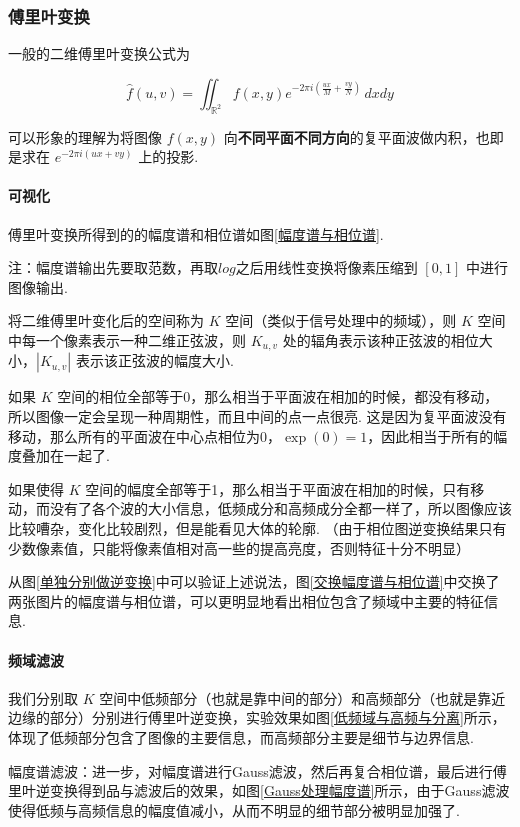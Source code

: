 \documentclass[12pt, a4paper, oneside]{ctexart}
\def\R{\mathbb{R}}          %
\begin{document}
\subsubsection{傅里叶变换}

一般的二维傅里叶变换公式为

\[\hat{f}(u,v) = \iint_{\R^2}f(x, y)e^{-2\pi i(\frac{ux}{M}+\frac{vy}{N})}\,dxdy\]

可以形象的理解为将图像 \(f(x,y)\)
向\textbf{不同平面不同方向}的复平面波做内积，也即是求在
\(e^{-2\pi i(ux+vy)}\) 上的投影.

\paragraph{可视化} 傅里叶变换所得到的的幅度谱和相位谱如图\ref{幅度谱与相位谱}.

注：幅度谱输出先要取范数，再取$log$之后用线性变换将像素压缩到 \([0,1]\) 中进行图像输出.

将二维傅里叶变化后的空间称为 \(K\) 空间（类似于信号处理中的频域），则 \(K\)
空间中每一个像素表示一种二维正弦波，则 \(K_{u,v}\)
处的辐角表示该种正弦波的相位大小，\(|K_{u,v}|\) 表示该正弦波的幅度大小.

如果 \(K\)
空间的相位全部等于0，那么相当于平面波在相加的时候，都没有移动，所以图像一定会呈现一种周期性，而且中间的点一点很亮.
这是因为复平面波没有移动，那么所有的平面波在中心点相位为0，\(\exp(0)=1\)，因此相当于所有的幅度叠加在一起了.

如果使得 \(K\)
空间的幅度全部等于1，那么相当于平面波在相加的时候，只有移动，而没有了各个波的大小信息，低频成分和高频成分全都一样了，所以图像应该比较嘈杂，变化比较剧烈，但是能看见大体的轮廓.
（由于相位图逆变换结果只有少数像素值，只能将像素值相对高一些的提高亮度，否则特征十分不明显）

从图\ref{单独分别做逆变换}中可以验证上述说法，图\ref{交换幅度谱与相位谱}中交换了两张图片的幅度谱与相位谱，可以更明显地看出相位包含了频域中主要的特征信息.

\paragraph{频域滤波}
我们分别取 \(K\)
空间中低频部分（也就是靠中间的部分）和高频部分（也就是靠近边缘的部分）分别进行傅里叶逆变换，实验效果如图\ref{低频域与高频与分离}所示，体现了低频部分包含了图像的主要信息，而高频部分主要是细节与边界信息.

幅度谱滤波：进一步，对幅度谱进行Gauss滤波，然后再复合相位谱，最后进行傅里叶逆变换得到品与滤波后的效果，如图\ref{Gauss处理幅度谱}所示，由于Gauss滤波使得低频与高频信息的幅度值减小，从而不明显的细节部分被明显加强了.
\end{document}
